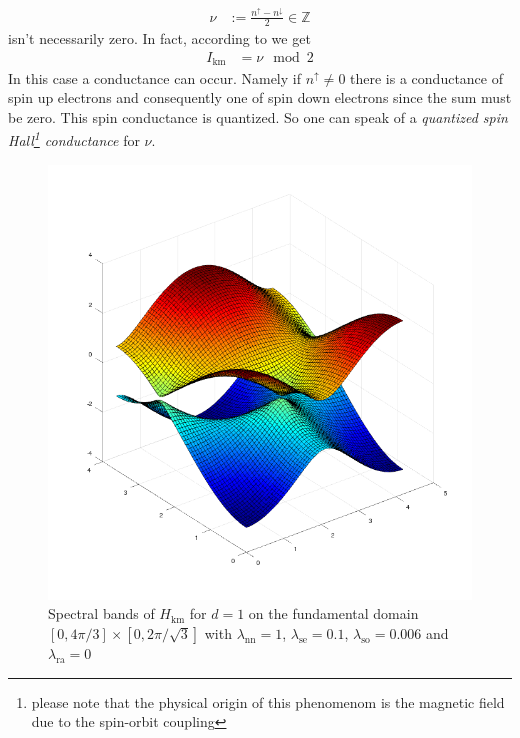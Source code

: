 \begin{enumerate}
\begin{align*}
  \nu
  &:=
  \frac{n^{\uparrow} - n^{\downarrow}}{2}
  \in
  \mathbb{Z}
\end{align*}
isn't necessarily zero. In fact, according to \cite{f6db8935} we get
\begin{align*}
  I_{\textrm{km}}
  &=
  \nu
  \mod
  2
\end{align*}
In this case a conductance can occur. Namely if $n^{\uparrow} \neq 0$ there is a conductance of spin up electrons and consequently one of spin down electrons since the sum must be zero. This spin conductance is quantized. So one can speak of a \textit{quantized spin Hall\footnote{please note that the physical origin of this phenomenom is the magnetic field due to the spin-orbit coupling} conductance} for $\nu$.
\begin{figure}[H]
\includegraphics[scale=0.4]{graphics/specins.png}
\caption{Spectral bands of $H_{\textrm{km}}$ for $d = 1$ on the fundamental domain $[0,4\pi/3] \times [0,2\pi/\sqrt{3}]$ with $\lambda_{\textrm{nn}} = 1$, $\lambda_{\textrm{se}} = 0.1$, $\lambda_{\textrm{so}} = 0.006$ and $\lambda_{\textrm{ra}} = 0$}
\label{fig:specins}
\end{figure}
\begin{figure}[H]

\end{figure}
\end{enumerate}
